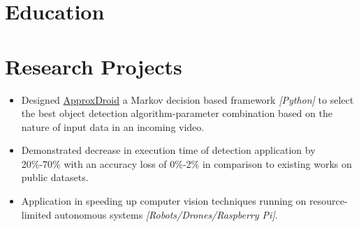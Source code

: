 \documentclass[10pt,a4paper,roman,colorlinks,linkcolor=true]{moderncv}   %
\begin{document}
\vspace*{-2\baselineskip}
\hypersetup{urlcolor=links}

\maketitle

\vspace{-0.3in}
\section{Education}


\section{Research Projects}
{
\vspace*{-1\baselineskip}
\begin{itemize}%
\item {Designed \href{https://www.eden.rutgers.edu/~pp395/ApproxDroid.html}{ApproxDroid}  a Markov decision based framework \emph{[Python]} to select the best object detection algorithm-parameter combination based on the nature of input data in an incoming video.}
\item {Demonstrated decrease in execution time of detection application by 20\%-70\% with an accuracy loss of 0\%-2\% in comparison to existing works on public datasets.  }
\item {Application in speeding up computer vision techniques running on resource-limited autonomous systems \emph{[Robots/Drones/Raspberry Pi]}.}\end{itemize}
}
\end{document}
